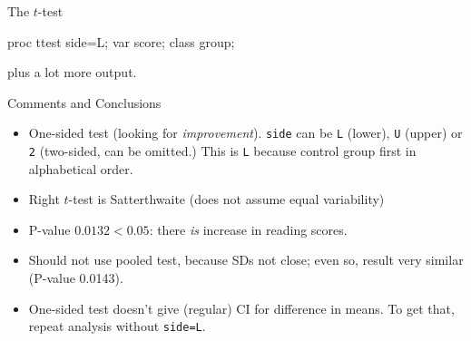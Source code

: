 \documentclass[unknownkeysallowed]{beamer}\usepackage[]{graphicx}\usepackage[]{color}
\begin{document}
\begin{frame}[fragile]{The $t$-test}

\begin{Sascode}[store=ihy]
  proc ttest side=L;
    var score;
    class group;
\end{Sascode}


plus a lot more output. 



\end{frame}

\begin{frame}{Comments and Conclusions}

  \begin{itemize}
  \item One-sided test (looking for \emph{improvement}). \texttt{side}
    can be \texttt{L} (lower), \texttt{U} (upper) or \texttt{2}
    (two-sided, can be omitted.) This is \texttt{L} because control
    group first in alphabetical order.
  \item Right $t$-test is Satterthwaite (does not assume equal variability)
  \item P-value $0.0132<0.05$: there \emph{is} increase in reading scores.
  \item Should not use pooled test, because SDs not close; even so,
    result very similar (P-value 0.0143).
  \item One-sided test doesn't give (regular) CI for difference in
    means. To get that, repeat analysis without \texttt{side=L}.
  \end{itemize}
  
\end{frame}
\end{document}
